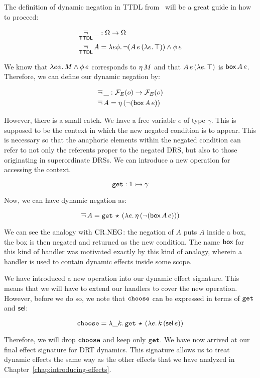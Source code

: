 The definition of dynamic negation in TTDL
from~\cite{lebedeva2012expression} will be a great guide in how to proceed:

\begin{align*}
\mathop{\overline{\lnot}}_{\textsf{TTDL}} \_ &: \Omega \to \Omega \\
\mathop{\overline{\lnot}}_{\textsf{TTDL}} A &= \lambda e \phi.\, \lnot (A\,e\,(\lambda e.\, \top)) \land \phi\,e
\end{align*}

We know that $\lambda e \phi.\, M \land \phi\,e$ corresponds to $\eta\,M$
and that $A\,e\,(\lambda e.\, \top)$ is $\textsf{box}\,A\,e$. Therefore, we
can define our dynamic negation by:

\begin{align*}
\mathop{\overline{\lnot}} \_ &: \mathcal{F}_E(o) \to \mathcal{F}_E(o) \\
\mathop{\overline{\lnot}} A &= \eta\,(\lnot (\textsf{box}\,A\,e))
\end{align*}

However, there is a small catch. We have a free variable $e$ of type
$\gamma$. This is supposed to be the context in which the new negated
condition is to appear. This is necessary so that the anaphoric elements
within the negated condition can refer to not only the referents proper to
the negated DRS, but also to those originating in superordinate DRSs. We
can introduce a new operation for accessing the context.

$$
\mathtt{get} : 1 \rightarrowtail \gamma
$$

Now, we can have dynamic negation as:

$$
\mathop{\overline{\lnot}} A = \mathtt{get}\,\star\,(\lambda e.\, \eta\,(\lnot (\textsf{box}\,A\,e)))
$$

We can see the analogy with $\mathrm{CR.NEG}$: the negation of $A$ puts $A$ inside a
box, the box is then negated and returned as the new condition. The name
$\textsf{box}$ for this kind of handler was motivated exactly by this kind of
analogy, wherein a handler is used to contain dynamic effects inside some
scope.

We have introduced a new operation into our dynamic effect signature. This
means that we will have to extend our handlers to cover the new
operation. However, before we do so, we note that $\mathtt{choose}$ can be
expressed in terms of $\mathtt{get}$ and $\textsf{sel}$:

$$
\mathtt{choose} = \lambda \_ k.\, \mathtt{get}\,\star\,(\lambda e.\, k\,(\textsf{sel}\,e))
$$

Therefore, we will drop $\mathtt{choose}$ and keep only $\mathtt{get}$. We have now
arrived at our final effect signature for DRT dynamics. This signature
allows us to treat dynamic effects the same way as the other effects that
we have analyzed in Chapter~\ref{chap:introducing-effects}.

